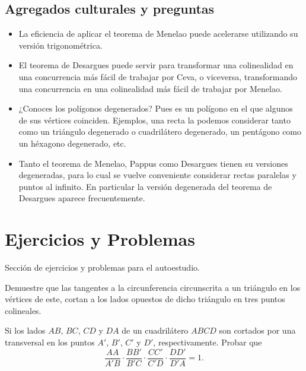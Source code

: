 \subsection{Agregados culturales y preguntas}

\begin{itemize}
    \item La eficiencia de aplicar el teorema de Menelao puede acelerarse utilizando su versión trigonométrica.
    \item El teorema de Desargues puede servir para transformar una colinealidad en una concurrencia más fácil de trabajar por Ceva, o viceversa, transformando una concurrencia en una colinealidad más fácil de trabajar por Menelao.
    \item ¿Conoces los polígonos degenerados?
    Pues es un polígono en el que algunos de sus vértices coinciden.
    Ejemplos, una recta la podemos considerar tanto como un triángulo degenerado o cuadrilátero degenerado, un pentágono como un héxagono degenerado, etc.
    \item Tanto el teorema de Menelao, Pappus como Desargues tienen su versiones degeneradas, para lo cual se vuelve conveniente considerar rectas paralelas y puntos al infinito.
    En particular la versión degenerada del teorema de Desargues aparece frecuentemente.
\end{itemize}




\section{Ejercicios y Problemas}

Sección de ejercicios y problemas para el autoestudio.

\begin{section-problem}
    Demuestre que las tangentes a la circunferencia circunscrita a un triángulo en los vértices de este, cortan a los lados opuestos de dicho triángulo en tres puntos colineales.
\end{section-problem}

\begin{section-problem}
    Si los lados $AB$, $BC$, $CD$ y $DA$ de un cuadrilátero $ABCD$ son cortados por una transversal en los puntos $A'$, $B'$, $C'$ y $D'$, respectivamente.
    Probar que
    \[
        \dfrac{AA}{A'B} \cdot \dfrac{BB'}{B'C} \cdot \dfrac{CC'}{C'D} \cdot \dfrac{DD'}{D'A} = 1.
    \]
\end{section-problem}

